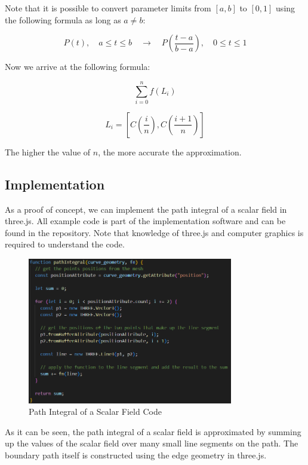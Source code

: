 \documentclass[12pt]{article}
\begin{document}
Note that it is possible to convert parameter limits from \([a, b]\) to \([0, 1]\) using the following formula as long as \(a \neq b\):

\[
    P(t), \quad a \leq t \leq b \quad \rightarrow \quad P\left(\frac{t - a}{b - a}\right), \quad 0 \leq t \leq 1
\]

Now we arrive at the following formula:

\[
    \sum_{i=0}^{n} f\left(L_i\right)
\]

\[
    L_i = \left[C\left(\frac{i}{n}\right), C\left(\frac{i + 1}{n}\right)\right]
\]

The higher the value of \(n\), the more accurate the approximation.

\subsection{Implementation}

As a proof of concept, we can implement the path integral of a scalar field in three.js\cite{El-Deeb_PEU-218_Stokes_Threejs}. All example code is
part of the implementation software and can be found in the repository\cite{El-Deeb_PEU-218_Assignments}. Note that knowledge of three.js and computer graphics is required to understand the code.

\begin{figure}[H]
    \centering
    \includegraphics[width=0.8\textwidth]{images/path_int.png}
    \caption{Path Integral of a Scalar Field Code\cite{El-Deeb_PEU-218_Stokes_Threejs}}
\end{figure}

As it can be seen, the path integral of a scalar field is approximated by summing up the values of the scalar field over many small line segments on the path.
The boundary path itself is constructed using the edge geometry in three.js.
\end{document}
